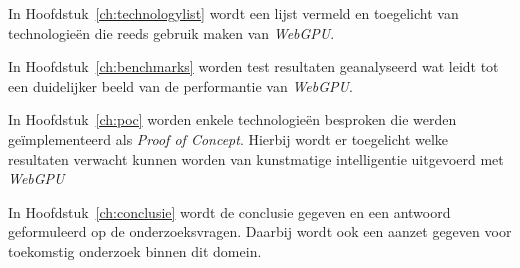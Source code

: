\bigbreak{}

In Hoofdstuk~\ref{ch:technologylist} wordt een lijst vermeld en toegelicht van technologieën die reeds gebruik maken van \textit{WebGPU}.

\bigbreak{}

In Hoofdstuk~\ref{ch:benchmarks} worden test resultaten geanalyseerd wat leidt tot een duidelijker beeld van de performantie van \textit{WebGPU}.

\bigbreak{}

In Hoofdstuk~\ref{ch:poc} worden enkele technologieën besproken die werden geïmplementeerd als \textit{Proof of Concept}. Hierbij wordt er toegelicht welke resultaten verwacht kunnen worden van kunstmatige intelligentie uitgevoerd met \textit{WebGPU}

\bigbreak{}

In Hoofdstuk~\ref{ch:conclusie} wordt de conclusie gegeven en een antwoord geformuleerd op de onderzoeksvragen. Daarbij wordt ook een aanzet gegeven voor toekomstig onderzoek binnen dit domein.